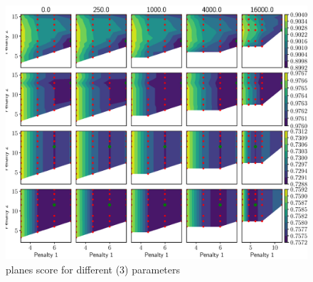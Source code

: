 \documentclass  [
  paper    = a4,
  BCOR     = 10mm,
  twoside,
  fontsize = 12pt,
  fleqn,
  toc      = bibnumbered,
  toc      = listofnumbered,
  numbers  = noendperiod,
  headings = normal,
  listof   = leveldown,
  version  = 3.03
]                                       {scrreprt}
\begin{document}
\begin{figure}
	\centering
	\includegraphics[width=1\linewidth]{images/sgm_params_contour_mae_planes}
	\caption[mae_planes]{planes score for different (3) parameters}
	\label{fig:sgmparamscontourdmae}
\end{figure}
\end{document}
